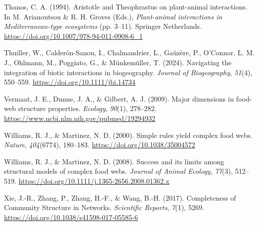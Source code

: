 \documentclass[
]{article}
\newlength{\cslhangindent}
\newenvironment{CSLReferences}[2] %
 {\begin{list}{}{%
  \setlength{\itemindent}{0pt}
  \setlength{\leftmargin}{0pt}
  \setlength{\parsep}{0pt}
  \ifodd #1
   \setlength{\leftmargin}{\cslhangindent}
   \setlength{\itemindent}{-1\cslhangindent}
  \fi
  \setlength{\itemsep}{#2\baselineskip}}}
 {\end{list}}
\begin{document}
\begin{CSLReferences}{1}{0}
Thanos, C. A. (1994). Aristotle and {Theophrastus} on plant-animal
interactions. In M. Arianoutsou \& R. H. Groves (Eds.),
\emph{Plant-animal interactions in {Mediterranean-type} ecosystems} (pp.
3--11). Springer Netherlands.
\url{https://doi.org/10.1007/978-94-011-0908-6_1}

Thuiller, W., Calderón-Sanou, I., Chalmandrier, L., Gaüzère, P.,
O'Connor, L. M. J., Ohlmann, M., Poggiato, G., \& Münkemüller, T.
(2024). Navigating the integration of biotic interactions in
biogeography. \emph{Journal of Biogeography}, \emph{51}(4), 550--559.
\url{https://doi.org/10.1111/jbi.14734}

Vermaat, J. E., Dunne, J. A., \& Gilbert, A. J. (2009). Major dimensions
in food-web structure properties. \emph{Ecology}, \emph{90}(1),
278--282. \url{https://www.ncbi.nlm.nih.gov/pubmed/19294932}

Williams, R. J., \& Martinez, N. D. (2000). Simple rules yield complex
food webs. \emph{Nature}, \emph{404}(6774), 180--183.
\url{https://doi.org/10.1038/35004572}

Williams, R. J., \& Martinez, N. D. (2008). Success and its limits among
structural models of complex food webs. \emph{Journal of Animal
Ecology}, \emph{77}(3), 512--519.
\url{https://doi.org/10.1111/j.1365-2656.2008.01362.x}

Xie, J.-R., Zhang, P., Zhang, H.-F., \& Wang, B.-H. (2017). Completeness
of {Community Structure} in {Networks}. \emph{Scientific Reports},
\emph{7}(1), 5269. \url{https://doi.org/10.1038/s41598-017-05585-6}

\end{CSLReferences}
\end{document}

